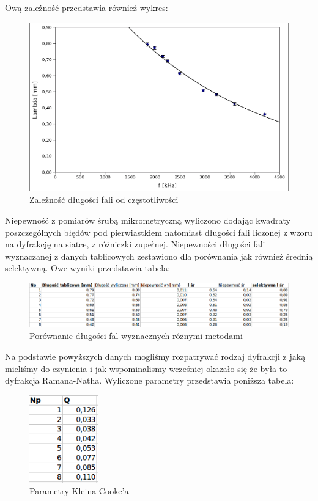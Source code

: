 \documentclass[a4paper,12pt]{article}
\begin{document}
Ową zależność przedstawia również wykres: 

\begin{figure} [H]
  \begin{center}
    \includegraphics[width = 12cm]{wykres1.png}
    \caption{Zależność długości fali od częstotliwości}
  \end{center}
\end{figure}

Niepewność z pomiarów śrubą mikrometryczną wyliczono dodając kwadraty poszczególnych błędów pod pierwiastkiem natomiast długości fali liczonej z wzoru na dyfrakcję na siatce, z różniczki zupełnej. Niepewności długości fali wyznaczanej z danych tablicowych zestawiono dla porównania jak również średnią selektywną. Owe wyniki przedstawia tabela: 


\begin{figure} [H]
  \begin{center}
    \includegraphics[width = 17cm]{tab5.png}
    \caption{Porównanie długości fal wyznacznych różnymi metodami}
  \end{center}
\end{figure}

Na podstawie powyższych danych mogliśmy rozpatrywać rodzaj dyfrakcji z jaką mieliśmy do czynienia i jak wspominalismy wcześniej okazało się że była to dyfrakcja Ramana-Natha. Wyliczone parametry  przedstawia poniższa tabela: 

\begin{figure} [H]
  \begin{center}
    \includegraphics[width = 3cm]{tab6.png}
    \caption{Parametry Kleina-Cooke'a}
  \end{center}
\end{figure}
\end{document}
